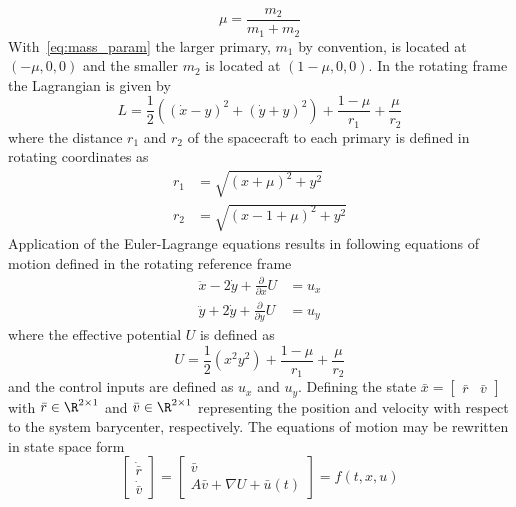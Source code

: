 \begin{equation}
	\mu = \frac{m_2}{m_1+m_2}
	\label{eq:mass_param}
\end{equation}
With~\eqref{eq:mass_param} the larger primary, \(m_1\) by convention, is located at \( \left(  -\mu , 0 , 0\right)\) and the smaller \( m_2\) is located at \( \left( 1-\mu , 0 , 0\right)\).
In the rotating frame the Lagrangian is given by
\begin{equation}
	L = \frac{1}{2} \left( \left( \dot{x} -y \right)^2 + \left( \dot{y} + y \right)^2 \right) + \frac{1-\mu}{r_1} + \frac{\mu}{r_2}
	\label{eq:lagrangian}
\end{equation}
where the distance \(r_1\) and \(r_2\) of the spacecraft to each primary is defined in rotating coordinates as
\begin{align}
	r_1 &= \sqrt{\left( x+ \mu\right)^2 + y^2} \\
	r_2 &= \sqrt{\left( x - 1 + \mu\right)^2 + y^2}
	\label{eq:distances}
\end{align}
Application of the Euler-Lagrange equations results in following equations of motion defined in the rotating reference frame
\begin{align}
	\ddot{x} - 2 \dot{y} + \frac{\partial}{\partial x} U &= u_x \nonumber \\
	\ddot{y} + 2 \dot{y} + \frac{\partial}{\partial y} U &= u_y 
	\label{eq:cont_eom}
\end{align}
where the effective potential \( U\) is defined as
\begin{equation}
	U = \frac{1}{2} \left( x^2 y^2\right) + \frac{1-\mu}{r_1} + \frac{\mu}{r_2}
	\label{eq:eff_pot}
\end{equation}
and the control inputs are defined as \( u_x\) and \(u_y\).
Defining the state \( \bar{x} = \begin{bmatrix}\bar{r} &\bar{v} \end{bmatrix}\) with \(\bar{r} \in \R^{2\times1}\) and \(\bar{v} \in \R^{2\times1}\) representing the position and velocity with respect to the system barycenter, respectively.
The equations of motion may be rewritten in state space form
\begin{equation}
	\left[\begin{array}{c} \dot{\bar{r}} \\ \dot{\bar{v}} \end{array} \right] = 
	\left[ \begin{array}{c} \bar{v} \\ A \bar{v} + \nabla U + \bar{u}(t) \end{array} \right] = f\left( t,x, u\right)
\end{equation}
